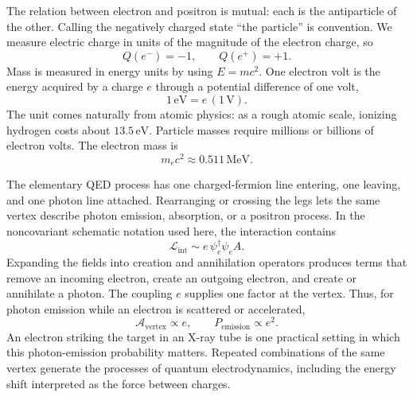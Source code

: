 The relation between electron and positron is mutual: each is the antiparticle of the other. Calling the negatively charged state ``the particle'' is convention. We measure electric charge in units of the magnitude of the electron charge, so
\begin{equation}
Q(e^-)=-1,\qquad Q(e^+)=+1.
\end{equation}
Mass is measured in energy units by using \(E=mc^2\). One electron volt is the energy acquired by a charge \(e\) through a potential difference of one volt,
\begin{equation}
1\,\mathrm{eV}=e\,(1\,\mathrm V).
\end{equation}
The unit comes naturally from atomic physics: as a rough atomic scale, ionizing hydrogen costs about \(13.5\,\mathrm{eV}\). Particle masses require millions or billions of electron volts. The electron mass is
\begin{equation}
m_e c^2 \approx 0.511\,\mathrm{MeV}.
\end{equation}

\begin{classroomqa}
\end{classroomqa}

The elementary QED process has one charged-fermion line entering, one leaving, and one photon line attached. Rearranging or crossing the legs lets the same vertex describe photon emission, absorption, or a positron process. In the noncovariant schematic notation used here, the interaction contains
\begin{equation}
\mathcal{L}_{\mathrm{int}}\sim e\,\psi_e^\dagger \psi_e A.
\end{equation}
Expanding the fields into creation and annihilation operators produces terms that remove an incoming electron, create an outgoing electron, and create or annihilate a photon. The coupling \(e\) supplies one factor at the vertex. Thus, for photon emission while an electron is scattered or accelerated,
\begin{equation}
\mathcal{A}_{\mathrm{vertex}}\propto e,
\qquad
P_{\mathrm{emission}}\propto e^2.
\end{equation}
An electron striking the target in an X-ray tube is one practical setting in which this photon-emission probability matters. Repeated combinations of the same vertex generate the processes of quantum electrodynamics, including the energy shift interpreted as the force between charges.

